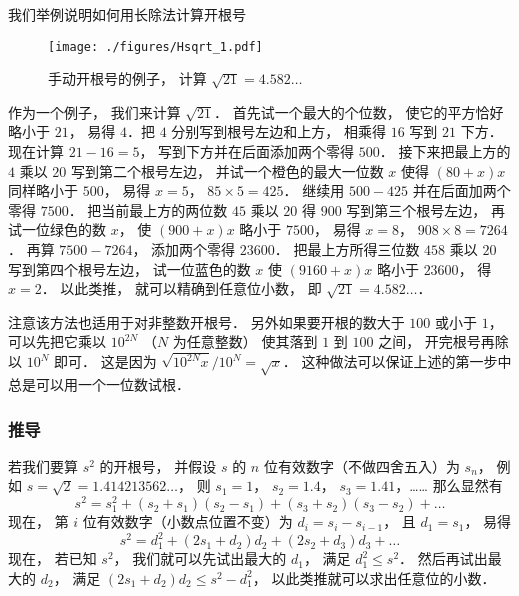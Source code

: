 
我们举例说明如何用长除法计算开根号
\begin{example}{}
\begin{figure}[ht]
\centering
\texttt{[image: ./figures/Hsqrt\_1.pdf]}
\caption{手动开根号的例子， 计算 $\sqrt{21} = 4.582\dots$} \label{Hsqrt_fig1}
\end{figure}
作为一个例子， 我们来计算 $\sqrt{21}$． 首先试一个最大的个位数， 使它的平方恰好略小于 $21$， 易得 $4$．把 $4$ 分别写到根号左边和上方， 相乘得 $16$ 写到 $21$ 下方． 现在计算 $21-16 = 5$， 写到下方并在后面添加两个零得 $500$． 接下来把最上方的 $4$ 乘以 $20$ 写到第二个根号左边， 并试一个橙色的最大一位数 $x$ 使得 $(80+x) x$ 同样略小于 $500$， 易得 $x = 5$， $85\times 5 = 425$． 继续用 $500-425$ 并在后面加两个零得 $7500$． 把当前最上方的两位数 $45$ 乘以 $20$ 得 $900$ 写到第三个根号左边， 再试一位绿色的数 $x$， 使 $(900+ x) x$ 略小于 $7500$， 易得 $x = 8$， $908\times 8 = 7264$． 再算 $7500-7264$， 添加两个零得 $23600$． 把最上方所得三位数 $458$ 乘以 $20$ 写到第四个根号左边， 试一位蓝色的数 $x$ 使 $(9160+x)x$ 略小于 $23600$， 得 $x = 2$． 以此类推， 就可以精确到任意位小数， 即 $\sqrt{21} = 4.582\dots$．

注意该方法也适用于对非整数开根号． 另外如果要开根的数大于 $100$ 或小于 $1$， 可以先把它乘以 $10^{2N}$ （$N$ 为任意整数） 使其落到 $1$ 到 $100$ 之间， 开完根号再除以 $10^N$ 即可． 这是因为 $\sqrt{10^{2N} x}/10^N =  \sqrt{x}$． 这种做法可以保证上述的第一步中总是可以用一个一位数试根．
\end{example}

\subsubsection{推导}
若我们要算 $s^2$ 的开根号， 并假设 $s$ 的 $n$ 位有效数字（不做四舍五入）为 $s_n$， 例如 $s = \sqrt{2} = 1.414213562\dots$， 则 $s_1 = 1$， $s_2=1.4$， $s_3=1.41$，…… 那么显然有
\begin{equation}
s^2 = s_1^2 + (s_2+s_1)(s_2-s_1) + (s_3+s_2)(s_3-s_2) + \dots
\end{equation}
现在， 第 $i$ 位有效数字（小数点位置不变）为 $d_i = s_i-s_{i-1}$， 且 $d_1 = s_1$， 易得
\begin{equation}
s^2 = d_1^2 + (2s_1 + d_2)d_2 + (2s_2 + d_3)d_3 + \dots
\end{equation}
现在， 若已知 $s^2$， 我们就可以先试出最大的 $d_1$， 满足 $d_1^2\leqslant s^2$． 然后再试出最大的 $d_2$， 满足 $(2s_1 + d_2)d_2 \leqslant s^2 - d_1^2$， 以此类推就可以求出任意位的小数．
